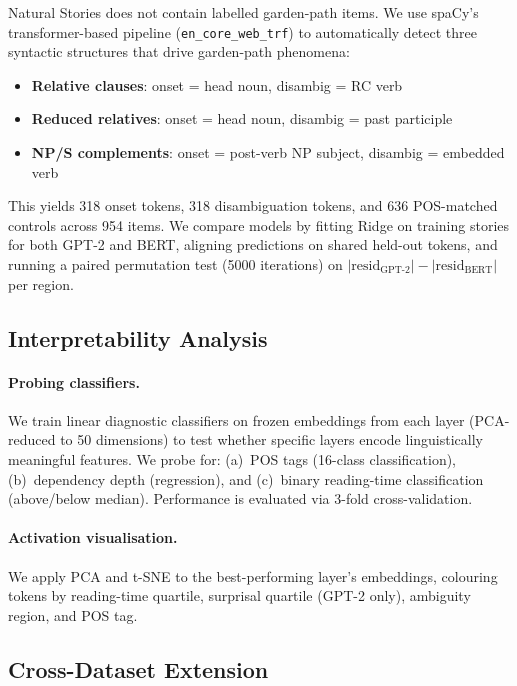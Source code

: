 \documentclass[11pt]{article}
\begin{document}
Natural Stories does not contain labelled garden-path items.
We use spaCy's transformer-based pipeline (\texttt{en\_core\_web\_trf}) to automatically detect three syntactic structures that drive garden-path phenomena:
\begin{itemize}
    \item \textbf{Relative clauses}: onset = head noun, disambig = RC verb
    \item \textbf{Reduced relatives}: onset = head noun, disambig = past participle
    \item \textbf{NP/S complements}: onset = post-verb NP subject, disambig = embedded verb
\end{itemize}
This yields 318 onset tokens, 318 disambiguation tokens, and 636 POS-matched controls across 954 items.
We compare models by fitting Ridge on training stories for both GPT-2 and BERT, aligning predictions on shared held-out tokens, and running a paired permutation test (5000 iterations) on $|\text{resid}_\text{GPT-2}| - |\text{resid}_\text{BERT}|$ per region.

\subsection{Interpretability Analysis}

\paragraph{Probing classifiers.}
We train linear diagnostic classifiers on frozen embeddings from each layer (PCA-reduced to 50 dimensions) to test whether specific layers encode linguistically meaningful features.
We probe for: (a)~POS tags (16-class classification), (b)~dependency depth (regression), and (c)~binary reading-time classification (above/below median).
Performance is evaluated via 3-fold cross-validation.

\paragraph{Activation visualisation.}
We apply PCA and t-SNE to the best-performing layer's embeddings, colouring tokens by reading-time quartile, surprisal quartile (GPT-2 only), ambiguity region, and POS tag.

\subsection{Cross-Dataset Extension}
\end{document}
